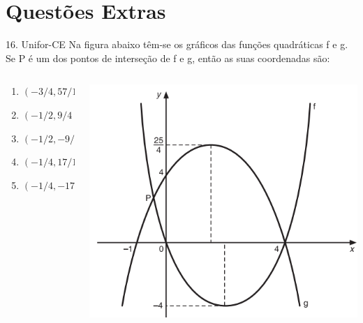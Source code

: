 \documentclass[11pt]{beamer}
\begin{document}
\section{Questões Extras}
\begin{frame}{16. Unifor-CE}
    Na figura abaixo têm-se os gráficos das funções quadráticas f e g. Se P é um dos pontos de interseção de f e g, então as suas coordenadas são:

    \begin{columns}
        \begin{column}{0.4\textwidth}
            \begin{enumerate}[a]
                \item $(-{3}/{4},{57}/{16})$ 
                \item $(-{1}/{2},{9}/{4})$  %
                \item $(-{1}/{2},-{9}/{4})$
                \item $(-{1}/{4},{17}/{16})$ 
                \item $(-{1}/{4},-{17}/{16})$
            \end{enumerate}
        \end{column}

        \begin{column}{0.6\textwidth}
            \centering
            \includegraphics[width=0.9\linewidth]{imagens/Unifor-CE.png}
        \end{column}
    \end{columns}
    
\end{frame}
\end{document}
